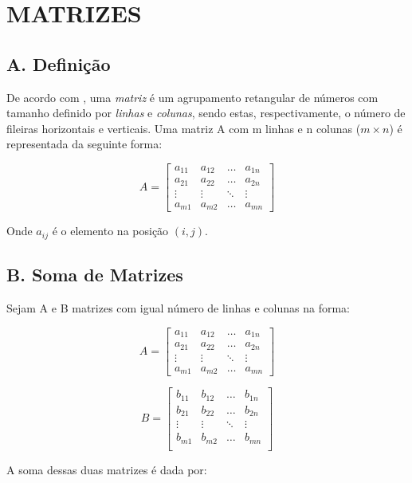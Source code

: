\documentclass[twocolumn, 10pt,a4paper]{extarticle}
\begin{document}
\section{MATRIZES}
\subsection*{A. \quad Definição}
De acordo com \cite[p. 26]{antonAlgebra}, uma \textit{matriz} é um agrupamento retangular de números com tamanho definido por \textit{linhas} e \textit{colunas}, sendo estas, respectivamente, o número de fileiras horizontais e verticais.
Uma matriz A com m linhas e n colunas ($m \times n$) é representada da seguinte forma:

\[ 
A = 
\begin{bmatrix}
a_{11} & a_{12} & \dots & a_{1n} \\
a_{21} & a_{22} & \dots & a_{2n} \\
\vdots & \vdots & \ddots & \vdots \\
a_{m1} & a_{m2} & \dots & a_{mn} 

\end{bmatrix}
\]

Onde $a_{ij}$ é o elemento na posição $(i, j)$.


\subsection*{B. \quad Soma de Matrizes}

Sejam A e B matrizes com igual número de linhas e colunas na forma:

\[ 
A = 
\begin{bmatrix}
a_{11} & a_{12} & \dots & a_{1n} \\
a_{21} & a_{22} & \dots & a_{2n} \\
\vdots & \vdots & \ddots & \vdots \\
a_{m1} & a_{m2} & \dots & a_{mn} 

\end{bmatrix}
\]

\[ 
B = 
\begin{bmatrix}
b_{11} & b_{12} & \dots & b_{1n} \\
b_{21} & b_{22} & \dots & b_{2n} \\
\vdots & \vdots & \ddots & \vdots \\
b_{m1} & b_{m2} & \dots & b_{mn}\\
\end{bmatrix}
\]

A soma dessas duas matrizes é dada por:
\end{document}

